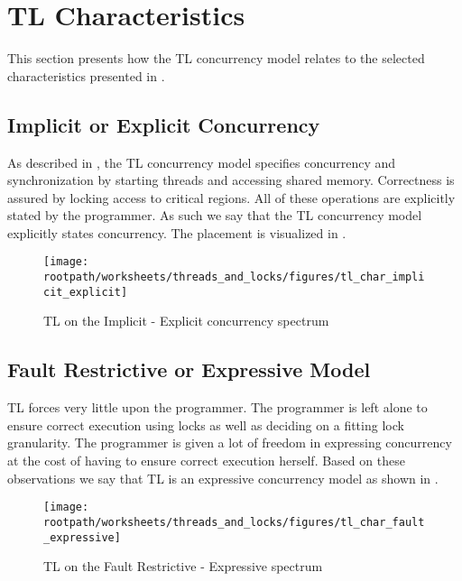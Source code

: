 
\section{\acl{TL} Characteristics}
This section presents how the \ac{TL} concurrency model relates to the selected characteristics presented in .

\subsection{Implicit or Explicit Concurrency}
As described in , the \ac{TL} concurrency model specifies concurrency and synchronization by starting threads and accessing shared memory. Correctness is assured by locking access to critical regions. All of these operations are explicitly stated by the programmer. As such we say that the \ac{TL} concurrency model explicitly states concurrency. The placement is visualized in .

\begin{figure}[htbp]
\centering
 \texttt{[image: \\rootpath/worksheets/threads\_and\_locks/figures/tl\_char\_implicit\_explicit]} 
 \caption{\ac{TL} on the Implicit - Explicit concurrency spectrum}
\label{fig:char_implicit_explicit}
\end{figure}

\subsection{Fault Restrictive or Expressive Model}
\ac{TL} forces very little upon the programmer. The programmer is left alone to ensure correct execution using locks as well as deciding on a fitting lock granularity. The programmer is given a lot of freedom in expressing concurrency at the cost of having to ensure correct execution herself. Based on these observations we say that \ac{TL} is an expressive concurrency model as shown in .

\begin{figure}[htbp]
\centering
 \texttt{[image: \\rootpath/worksheets/threads\_and\_locks/figures/tl\_char\_fault\_expressive]} 
 \caption{\ac{TL} on the Fault Restrictive - Expressive spectrum}
\label{fig:char_fault_expressive}
\end{figure}

